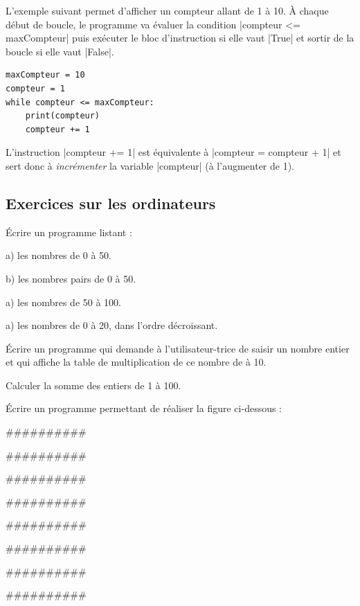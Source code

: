\documentclass[11pt, a4paper]{book}
\begin{document}
\begin{example}
\label{ex:counter}
L'exemple suivant permet d'afficher un compteur allant de 1 à 10. À chaque début de boucle, le programme va évaluer la condition |compteur <= maxCompteur| puis exécuter le bloc d'instruction si elle vaut |True| et sortir de la boucle si elle vaut |False|.
\end{example}

\begin{lstlisting}
maxCompteur = 10
compteur = 1
while compteur <= maxCompteur:
    print(compteur)
    compteur += 1
\end{lstlisting}

\begin{remarque}
L'instruction |compteur += 1| est équivalente à |compteur = compteur + 1| et sert donc à \textit{incrémenter} la variable |compteur| (à l'augmenter de 1).
\end{remarque}





\subsection{Exercices sur les ordinateurs}

\begin{exercice}
Écrire un programme listant :
\item[a)] les nombres de 0 à 50.
\item[b)] les nombres pairs de 0 à 50.
\item[a)] les nombres de 50 à 100.
\item[a)] les nombres  de 0 à 20, dans l'ordre décroissant.
\end{exercice}

\begin{exercice}
Écrire un programme qui demande à l'utilisateur-trice de saisir un nombre entier et qui affiche la table de multiplication de ce nombre de à 10.
\end{exercice}


\begin{exercice}
Calculer la somme des entiers de 1 à 100.
\end{exercice}

\begin{exercice}
Écrire un programme permettant de réaliser la figure ci-dessous :

\#\#\#\#\#\#\#\#\#\#

\#\#\#\#\#\#\#\#\#\#

\#\#\#\#\#\#\#\#\#\#

\#\#\#\#\#\#\#\#\#\#

\#\#\#\#\#\#\#\#\#\#

\#\#\#\#\#\#\#\#\#\#

\#\#\#\#\#\#\#\#\#\#

\#\#\#\#\#\#\#\#\#\#
\end{exercice}
\end{document}
